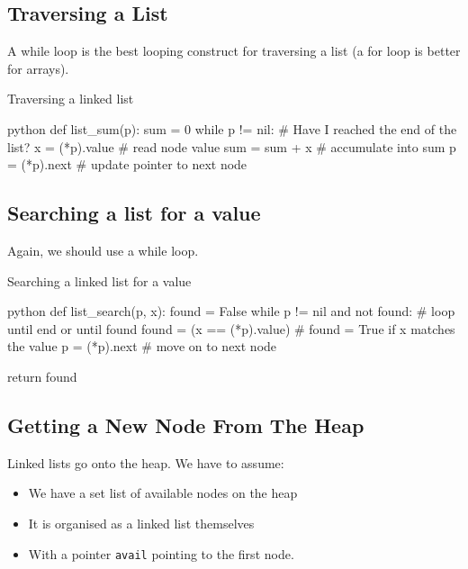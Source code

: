 \subsection{Traversing a List}\label{sub:traversing_a_list}

A while loop is the best looping construct for traversing a list (a for loop is better for arrays).

\begin{highlight}{Traversing a linked list}
    \begin{code}{python}
        def list_sum(p):
        sum = 0
        while p != nil: # Have I reached the end of the list?
        x = (*p).value # read node value
        sum = sum + x # accumulate into sum
        p = (*p).next # update pointer to next node
    \end{code}
\end{highlight}

\subsection{Searching a list for a value}\label{sub:searching_a_list_for_a_value}

Again, we should use a while loop.

\begin{highlight}{Searching a linked list for a value}
    \begin{code}{python}
        def list_search(p, x):
        found = False
        while p != nil and not found: # loop until end or until found
        found = (x == (*p).value) # found = True if x matches the value
        p = (*p).next # move on to next node

        return found
    \end{code}
\end{highlight}

\subsection{Getting a New Node From The Heap}\label{sub:getting_a_new_node_from_the_heap}

Linked lists go onto the heap.
We have to assume:
\begin{itemize}
    \item We have a set list of available nodes on the heap
    \item It is organised as a linked list themselves
    \item With a pointer \texttt{avail} pointing to the first node.
\end{itemize}

